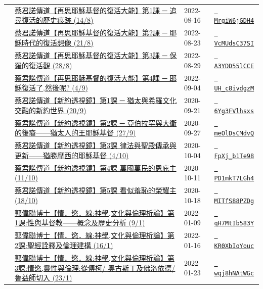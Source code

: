 \documentclass{book}
\begin{document}
{\begin{xltabular}{\textwidth}{|p{0.15\textwidth} p{0.6\textwidth}|p{0.07\textwidth} p{0.1\textwidth}|}
    & \hyperref[sec:MrgiW6jGDH4]{蔡君諾傳道【再思耶穌基督的復活大能】第1課 ─ 追尋復活的歷史痕跡 (14/8)} & 2022-08-16 & \href{https://youtube.com/watch?v=MrgiW6jGDH4}{\texttt{ MrgiW6jGDH4}} \\
    & \hyperref[sec:VcMUdsC37SI]{蔡君諾傳道【再思耶穌基督的復活大能】第2課 ─ 耶穌時代的復活想像 (21/8)} & 2022-08-23 & \href{https://youtube.com/watch?v=VcMUdsC37SI}{\texttt{ VcMUdsC37SI}} \\
    & \hyperref[sec:A3YDD55lCCE]{蔡君諾傳道【再思耶穌基督的復活大能】第3課 ─ 保羅的復活觀 (28/8)} & 2022-08-29 & \href{https://youtube.com/watch?v=A3YDD55lCCE}{\texttt{ A3YDD55lCCE}} \\
    & \hyperref[sec:UH_c8ivdgzM]{蔡君諾傳道【再思耶穌基督的復活大能】第4課 ─ 耶穌復活了,然後呢? (4/9)} & 2022-09-04 & \href{https://youtube.com/watch?v=UH_c8ivdgzM}{\texttt{ UH\_c8ivdgzM}} \\
    & \hyperref[sec:6Yg3FVlhsxs]{蔡君諾傳道【新約透視鏡】第1課 ─ 猶太與希羅文化交融的新約世界 (20/9)} & 2020-09-21 & \href{https://youtube.com/watch?v=6Yg3FVlhsxs}{\texttt{ 6Yg3FVlhsxs}} \\
    & \hyperref[sec:meOlDsCMdvQ]{蔡君諾傳道【新約透視鏡】第2課 ─ 亞伯拉罕與大衛的後裔——猶太人的王耶穌基督 (27/9)} & 2020-09-27 & \href{https://youtube.com/watch?v=meOlDsCMdvQ}{\texttt{ meOlDsCMdvQ}} \\
    & \hyperref[sec:FpXj_b1Te98]{蔡君諾傳道【新約透視鏡】第3課  律法與聖殿傳承與更新——猶勝摩西的耶穌基督 (4/10)} & 2020-10-04 & \href{https://youtube.com/watch?v=FpXj_b1Te98}{\texttt{ FpXj\_b1Te98}} \\
    & \hyperref[sec:PD1mkT7LGh4]{蔡君諾傳道【新約透視鏡】第4課  萬國萬民的恩庇主 (11/10)} & 2020-10-11 & \href{https://youtube.com/watch?v=PD1mkT7LGh4}{\texttt{ PD1mkT7LGh4}} \\
    & \hyperref[sec:MITfS88PZDg]{蔡君諾傳道【新約透視鏡】第5課  看似羞恥的榮耀主 (18/10)} & 2020-10-18 & \href{https://youtube.com/watch?v=MITfS88PZDg}{\texttt{ MITfS88PZDg}} \\
    & \hyperref[sec:qH7MtIb583Y]{郭偉聯博士【情．慾．線:神學,文化與倫理析論】第1課:性與基督教——概念及歷史分析 (9/1)} & 2022-01-09 & \href{https://youtube.com/watch?v=qH7MtIb583Y}{\texttt{ qH7MtIb583Y}} \\
    & \hyperref[sec:KR0XbIoYouc]{郭偉聯博士【情．慾．線:神學,文化與倫理析論】第2課:聖經詮釋及倫理建構 (16/1)} & 2022-01-16 & \href{https://youtube.com/watch?v=KR0XbIoYouc}{\texttt{ KR0XbIoYouc}} \\
    & \hyperref[sec:wqj8hNAtWGc]{郭偉聯博士【情．慾．線:神學,文化與倫理析論】第3課:情慾,靈性與倫理:從傅柯/ 奧古斯丁及佛洛依德/ 魯益師切入 (23/1)} & 2022-01-23 & \href{https://youtube.com/watch?v=wqj8hNAtWGc}{\texttt{ wqj8hNAtWGc}} \\

\end{xltabular}}
\end{document}
